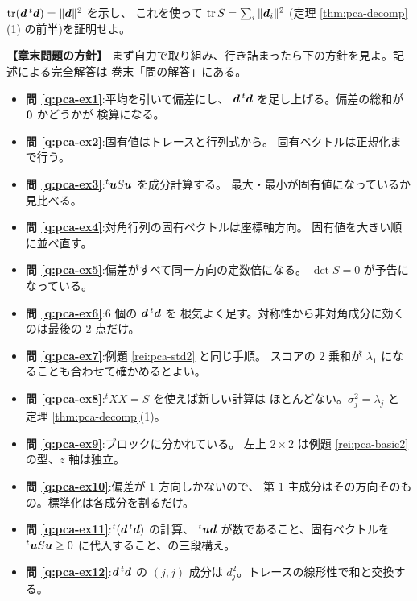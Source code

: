 \begin{mondai}[証明]\label{q:pca-ex12}
$\mathrm{tr}(\bm{d}\,{}^t\bm{d}) = \|\bm{d}\|^2$ を示し、
これを使って $\mathrm{tr}\,S = \sum_i \|\bm{d}_i\|^2$
(定理 \ref{thm:pca-decomp}(1) の前半)を証明せよ。
\end{mondai}

\bigskip
{\small
\noindent\textbf{【章末問題の方針】}\quad
まず自力で取り組み、行き詰まったら下の方針を見よ。記述による完全解答は
巻末「問の解答」にある。
\begin{itemize}
\item \textbf{問 \ref{q:pca-ex1}}:平均を引いて偏差にし、
$\bm{d}\,{}^t\bm{d}$ を足し上げる。偏差の総和が $\bm{0}$ かどうかが
検算になる。
\item \textbf{問 \ref{q:pca-ex2}}:固有値はトレースと行列式から。
固有ベクトルは正規化まで行う。
\item \textbf{問 \ref{q:pca-ex3}}:${}^t\bm{u}S\bm{u}$ を成分計算する。
最大・最小が固有値になっているか見比べる。
\item \textbf{問 \ref{q:pca-ex4}}:対角行列の固有ベクトルは座標軸方向。
固有値を大きい順に並べ直す。
\item \textbf{問 \ref{q:pca-ex5}}:偏差がすべて同一方向の定数倍になる。
$\det S = 0$ が予告になっている。
\item \textbf{問 \ref{q:pca-ex6}}:$6$ 個の $\bm{d}\,{}^t\bm{d}$ を
根気よく足す。対称性から非対角成分に効くのは最後の $2$ 点だけ。
\item \textbf{問 \ref{q:pca-ex7}}:例題 \ref{rei:pca-std2} と同じ手順。
スコアの $2$ 乗和が $\lambda_1$ になることも合わせて確かめるとよい。
\item \textbf{問 \ref{q:pca-ex8}}:${}^tXX = S$ を使えば新しい計算は
ほとんどない。$\sigma_j^2 = \lambda_j$ と
定理 \ref{thm:pca-decomp}(1)。
\item \textbf{問 \ref{q:pca-ex9}}:ブロックに分かれている。
左上 $2 \times 2$ は例題 \ref{rei:pca-basic2} の型、$z$ 軸は独立。
\item \textbf{問 \ref{q:pca-ex10}}:偏差が $1$ 方向しかないので、
第 $1$ 主成分はその方向そのもの。標準化は各成分を割るだけ。
\item \textbf{問 \ref{q:pca-ex11}}:${}^t(\bm{d}\,{}^t\bm{d})$ の計算、
${}^t\bm{u}\bm{d}$ が数であること、固有ベクトルを
${}^t\bm{u}S\bm{u} \ge 0$ に代入すること、の三段構え。
\item \textbf{問 \ref{q:pca-ex12}}:$\bm{d}\,{}^t\bm{d}$ の
$(j, j)$ 成分は $d_j^2$。トレースの線形性で和と交換する。
\end{itemize}
}

